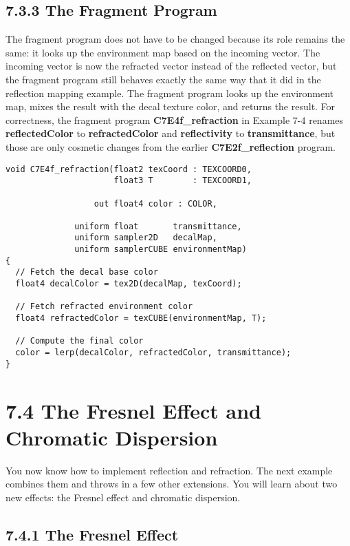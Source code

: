 \documentclass[../main.tex]{subfiles}
\begin{document}
\subsection{7.3.3 The Fragment Program}

The fragment program does not have to be changed because its role remains the same: it looks up the environment map based on the incoming vector. The incoming vector is now the refracted vector instead of the reflected vector, but the fragment program still behaves exactly the same way that it did in the reflection mapping example. The fragment program looks up the environment map, mixes the result with the decal texture color, and returns the result. For correctness, the fragment program \textbf{C7E4f_refraction} in Example 7-4 renames \textbf{reflectedColor} to \textbf{refractedColor} and \textbf{reflectivity} to \textbf{transmittance}, but those are only cosmetic changes from the earlier \textbf{C7E2f_reflection} program.

\FloatBarrier
\begin{lstlisting}[caption=Example 7-4. The \textbf{C7E4f_refraction} Fragment Program]
void C7E4f_refraction(float2 texCoord : TEXCOORD0,
                      float3 T        : TEXCOORD1,

                  out float4 color : COLOR,

              uniform float       transmittance,
              uniform sampler2D   decalMap,
              uniform samplerCUBE environmentMap)
{
  // Fetch the decal base color
  float4 decalColor = tex2D(decalMap, texCoord);

  // Fetch refracted environment color
  float4 refractedColor = texCUBE(environmentMap, T);

  // Compute the final color
  color = lerp(decalColor, refractedColor, transmittance);
}
\end{lstlisting}
\FloatBarrier

\section{7.4 The Fresnel Effect and Chromatic Dispersion}

You now know how to implement reflection and refraction. The next example combines them and throws in a few other extensions. You will learn about two new effects: the Fresnel effect and chromatic dispersion.

\subsection{7.4.1 The Fresnel Effect}
\end{document}
